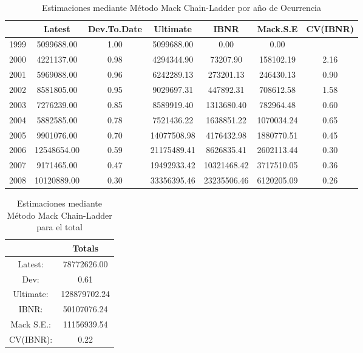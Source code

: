 \documentclass[
  12pt,
]{article}
\begin{document}
\begin{table}[ht]
\centering
\caption{Estimaciones mediante Método Mack Chain-Ladder por año de Ocurrencia} 
\label{origin2}
\begingroup\fontsize{10pt}{10pt}\selectfont
\begin{tabular}{ccccccc}
  \hline
 & Latest & Dev.To.Date & Ultimate & IBNR & Mack.S.E & CV(IBNR) \\ 
  \hline
1999 & 5099688.00 & 1.00 & 5099688.00 & 0.00 & 0.00 &  \\ 
  2000 & 4221137.00 & 0.98 & 4294344.90 & 73207.90 & 158102.19 & 2.16 \\ 
  2001 & 5969088.00 & 0.96 & 6242289.13 & 273201.13 & 246430.13 & 0.90 \\ 
  2002 & 8581805.00 & 0.95 & 9029697.31 & 447892.31 & 708612.58 & 1.58 \\ 
  2003 & 7276239.00 & 0.85 & 8589919.40 & 1313680.40 & 782964.48 & 0.60 \\ 
  2004 & 5882585.00 & 0.78 & 7521436.22 & 1638851.22 & 1070034.24 & 0.65 \\ 
  2005 & 9901076.00 & 0.70 & 14077508.98 & 4176432.98 & 1880770.51 & 0.45 \\ 
  2006 & 12548654.00 & 0.59 & 21175489.41 & 8626835.41 & 2602113.44 & 0.30 \\ 
  2007 & 9171465.00 & 0.47 & 19492933.42 & 10321468.42 & 3717510.05 & 0.36 \\ 
  2008 & 10120889.00 & 0.30 & 33356395.46 & 23235506.46 & 6120205.09 & 0.26 \\ 
   \hline
\end{tabular}
\endgroup
\end{table}

\begin{table}[ht]
\centering
\caption{Estimaciones mediante Método Mack Chain-Ladder para el total} 
\label{total2}
\begingroup\fontsize{10pt}{10pt}\selectfont
\begin{tabular}{cc}
  \hline
 & Totals \\ 
  \hline
Latest: & 78772626.00 \\ 
  Dev: & 0.61 \\ 
  Ultimate: & 128879702.24 \\ 
  IBNR: & 50107076.24 \\ 
  Mack S.E.: & 11156939.54 \\ 
  CV(IBNR): & 0.22 \\ 
   \hline
\end{tabular}
\endgroup
\end{table}
\end{document}
